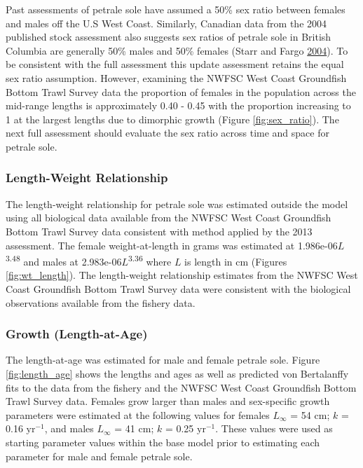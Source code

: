 \documentclass[12pt,]{article}
\begin{document}
Past assessments of petrale sole have assumed a 50\% sex ratio between
females and males off the U.S West Coast. Similarly, Canadian data from
the 2004 published stock assessment also suggests sex ratios of petrale
sole in British Columbia are generally 50\% males and 50\% females
(Starr and Fargo \protect\hyperlink{ref-starr_petrale_2004}{2004}). To
be consistent with the full assessment this update assessment retains
the equal sex ratio assumption. However, examining the NWFSC West Coast
Groundfish Bottom Trawl Survey data the proportion of females in the
population across the mid-range lengths is approximately 0.40 - 0.45
with the proportion increasing to 1 at the largest lengths due to
dimorphic growth (Figure \ref{fig:sex_ratio}). The next full assessment
should evaluate the sex ratio across time and space for petrale sole.

\subsubsection{Length-Weight
Relationship}\label{length-weight-relationship}

The length-weight relationship for petrale sole was estimated outside
the model using all biological data available from the NWFSC West Coast
Groundfish Bottom Trawl Survey data consistent with method applied by
the 2013 assessment. The female weight-at-length in grams was estimated
at 1.986e-06\(L\)\textsuperscript{3.48} and males at
2.983e-06\(L\)\textsuperscript{3.36} where \(L\) is length in cm
(Figures \ref{fig:wt_length}). The length-weight relationship estimates
from the NWFSC West Coast Groundfish Bottom Trawl Survey data were
consistent with the biological observations available from the fishery
data.

\subsubsection{Growth (Length-at-Age)}\label{growth-length-at-age}

The length-at-age was estimated for male and female petrale sole. Figure
\ref{fig:length_age} shows the lengths and ages as well as predicted von
Bertalanffy fits to the data from the fishery and the NWFSC West Coast
Groundfish Bottom Trawl Survey data. Females grow larger than males and
sex-specific growth parameters were estimated at the following values
for females \(L_{\infty}\) = 54 cm; \(k\) = 0.16 \(\text{yr}^{-1}\), and
males \(L_{\infty}\) = 41 cm; \(k\) = 0.25 \(\text{yr}^{-1}\). These
values were used as starting parameter values within the base model
prior to estimating each parameter for male and female petrale sole.
\end{document}
